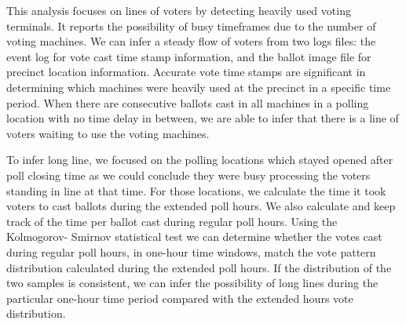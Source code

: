 This analysis focuses on lines of voters by detecting heavily used voting terminals. It reports the possibility of busy timeframes due to the number of voting machines. We can infer a steady flow of voters from two logs files: the event log for vote cast time stamp information, and the ballot image file for precinct location information. Accurate vote time stamps are significant in determining which machines were heavily used at the precinct in a specific time period. When there are consecutive ballots cast in all machines in a polling location with no time delay in between, we are able to infer that there is a line of voters waiting to use the voting machines. 

To infer long line, we focused on the polling locations which stayed opened after poll closing time as we could conclude they were busy processing the voters standing in line at that time. For those locations, we calculate the time it took voters to cast ballots during the extended poll hours. We also calculate and keep track of the time per ballot cast during regular poll hours. Using the Kolmogorov- Smirnov statistical test we can determine whether the votes cast during regular poll hours, in one-hour time windows, match the vote pattern distribution calculated during the extended poll hours. If the distribution of the two samples is consistent, we can infer the possibility of long lines during the particular one-hour time period compared with the extended hours vote distribution.
